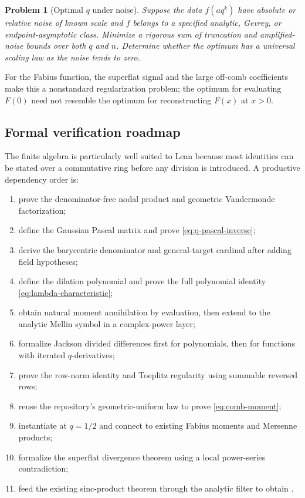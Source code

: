 \documentclass[11pt,a4paper,oneside]{article}
\newtheorem{problem}[problem]{Problem}
\theoremstyle{definition}
\theoremstyle{remark}
\begin{document}
\begin{problem}[Optimal $q$ under noise]
\label{prob:optimal-q}
Suppose the data $f(aq^k)$ have absolute or relative noise of known scale and
$f$ belongs to a specified analytic, Gevrey, or endpoint-asymptotic class.
Minimize a rigorous sum of truncation and amplified-noise bounds over both
$q$ and $n$.  Determine whether the optimum has a universal scaling law as the
noise tends to zero.
\end{problem}

For the Fabius function, the superflat signal and the large off-comb
coefficients make this a nonstandard regularization problem; the optimum for
evaluating $F(0)$ need not resemble the optimum for reconstructing $F(x)$ at
$x>0$.

\subsection{Formal verification roadmap}

The finite algebra is particularly well suited to Lean because most identities
can be stated over a commutative ring before any division is introduced.  A
productive dependency order is:

\begin{enumerate}
\item prove the denominator-free nodal product and geometric Vandermonde
      factorization;
\item define the Gaussian Pascal matrix and prove
      \eqref{eq:q-pascal-inverse};
\item derive the barycentric denominator and general-target cardinal after
      adding field hypotheses;
\item define the dilation polynomial and prove the full polynomial identity
      \eqref{eq:lambda-characteristic};
\item obtain natural moment annihilation by evaluation, then extend to the
      analytic Mellin symbol in a complex-power layer;
\item formalize Jackson divided differences first for polynomials, then for
      functions with iterated $q$-derivatives;
\item prove the row-norm identity and Toeplitz regularity using summable
      reversed rows;
\item reuse the repository's geometric-uniform law to prove
      \eqref{eq:comb-moment};
\item instantiate at $q=1/2$ and connect to existing Fabius moments and
      Mersenne products;
\item formalize the superflat divergence theorem using a local power-series
      contradiction;
\item feed the existing sinc-product theorem through the analytic filter to
      obtain .
\end{enumerate}
\end{document}
